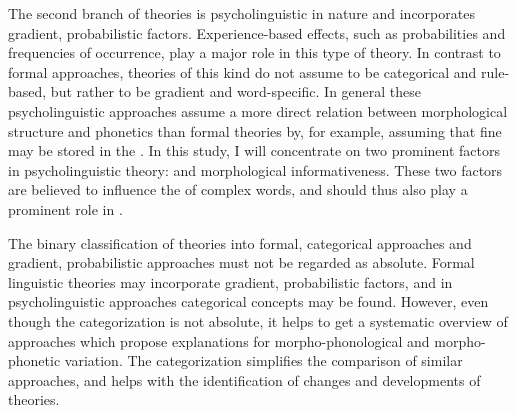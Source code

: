 
The second branch of theories is psycholinguistic in nature and incorporates gradient, probabilistic factors. Experience-based effects, such as probabilities and frequencies of occurrence, play a major role in this type of theory. In contrast to formal approaches, theories of this kind do not assume  to be categorical and rule-based, but rather to be gradient and word-specific. In  general these psycholinguistic approaches assume a more direct relation between morphological structure and phonetics than formal theories by, for example, assuming that fine  may be stored in the . In this study, I will concentrate on two prominent factors in psycholinguistic theory:  and morphological informativeness. These two factors are believed to influence the  of complex words, and should thus also play a prominent role in . 


The binary classification of theories into formal, categorical approaches and gradient, probabilistic approaches must not be regarded as absolute. Formal linguistic theories may incorporate gradient, probabilistic factors, and in psycholinguistic approaches categorical concepts may be found. However, even though the categorization is not absolute, it helps to get a systematic overview of approaches which propose explanations for morpho-phonological and morpho-phonetic variation. The categorization simplifies the comparison of similar approaches, and helps with the identification of changes and developments of theories.

